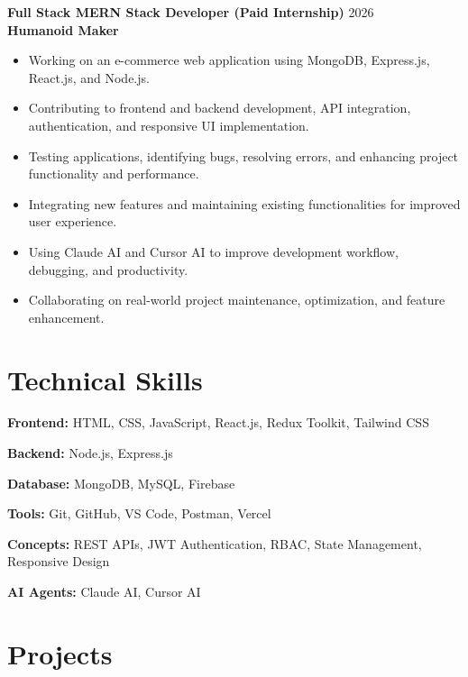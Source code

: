 \documentclass[a4paper,10pt]{article}
\newcommand{\resumeItem}[1]{
 \item \small{#1}
}
\begin{document}
\textbf{Full Stack MERN Stack Developer (Paid Internship)} \hfill 2026 \\
\textbf{Humanoid Maker}

\begin{itemize}

\resumeItem{Working on an e-commerce web application using MongoDB, Express.js, React.js, and Node.js.}

\resumeItem{Contributing to frontend and backend development, API integration, authentication, and responsive UI implementation.}

\resumeItem{Testing applications, identifying bugs, resolving errors, and enhancing project functionality and performance.}

\resumeItem{Integrating new features and maintaining existing functionalities for improved user experience.}

\resumeItem{Using Claude AI and Cursor AI to improve development workflow, debugging, and productivity.}

\resumeItem{Collaborating on real-world project maintenance, optimization, and feature enhancement.}

\end{itemize}

\section*{Technical Skills}

\begingroup
\small
\setlength{\parskip}{0pt}
\setlength{\parindent}{0pt}

\textbf{Frontend:} HTML, CSS, JavaScript, React.js, Redux Toolkit, Tailwind CSS\par
\textbf{Backend:} Node.js, Express.js\par
\textbf{Database:} MongoDB, MySQL, Firebase\par
\textbf{Tools:} Git, GitHub, VS Code, Postman, Vercel\par
\textbf{Concepts:} REST APIs, JWT Authentication, RBAC, State Management, Responsive Design\par
\textbf{AI Agents:} Claude AI, Cursor AI\par
\endgroup

\section*{Projects}
\end{document}
